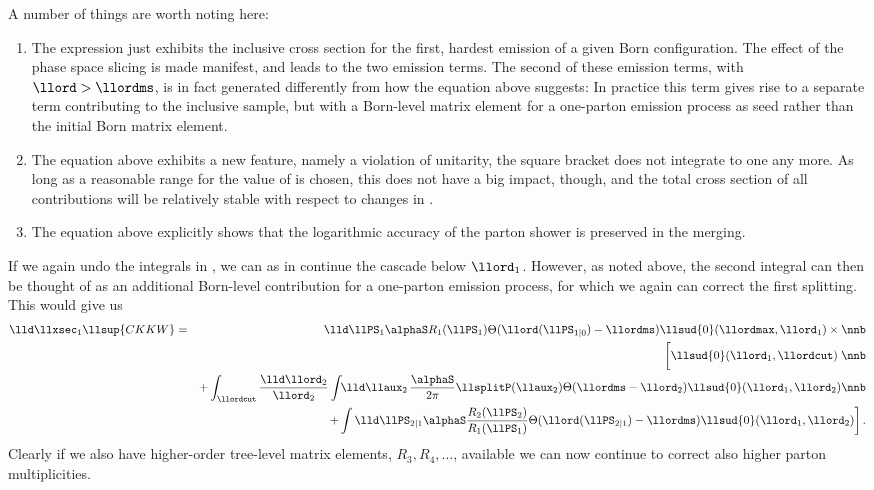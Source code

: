 A number of things are worth noting here:
\begin{enumerate}
\item The expression just exhibits the inclusive cross section for the
  first, hardest emission of a given Born configuration.  The effect
  of the phase space slicing is made manifest, and leads to the two
  emission terms.  The second of these emission terms, with
  $\llord>\llordms$, is in fact generated differently from how the
  equation above suggests: In practice this term gives rise to a
  separate term contributing to the inclusive sample, but with a
  Born-level matrix element for a one-parton emission process as seed
  rather than the initial Born matrix element.
\item The equation above exhibits a new feature, namely a violation of
  unitarity, \ie the square bracket does not integrate to one any more.
  As long as a reasonable range for the value of \llordms is chosen, this 
  does not have a big impact, though, and the total cross section of all
  contributions will be relatively stable with respect to changes in \llordms.  
\item The equation above explicitly shows that the logarithmic accuracy of
  the parton shower is preserved in the merging.
\end{enumerate}


If we again undo the integrals in , we
can as in  continue the cascade below
$\llord_1$. However, as noted above, the second integral can then be
thought of as an additional Born-level contribution for a one-parton
emission process, for which we again can correct the first splitting. This
would give us
\begin{eqnarray}
  \label{eq:matching:CKKWsecond}
  \lld\llxsec_1\llsup{CKKW}&=&
  \lld\llPS_1\alphaS R_1(\llPS_1)\Theta(\llord(\llPS_{1|0})-\llordms)
  \llsud{0}(\llordmax,\llord_1)\times\nnb\\
  &&\left[\llsud{0}(\llord_1,\llordcut)
    \vphantom{\int\frac{R_1}{B}}\right.\nnb\\
    &&+\int_{\llordcut}\frac{\lld\llord_2}{\llord_2}
    \int\!\!\lld\llaux_2\,\frac{\alphaS}{2\pi}\llsplitP(\llaux_2)
    \Theta(\llordms-\llord_2)
    \llsud{0}(\llord_1,\llord_2)\nnb\\
    &&\left.+\int\lld\llPS_{2|1}\alphaS
    \frac{R_2(\llPS_2)}{R_1(\llPS_1)}\Theta(\llord(\llPS_{2|1})-\llordms)
    \llsud{0}(\llord_1,\llord_2)\right].
\end{eqnarray}
Clearly if we also have higher-order tree-level matrix elements,
$R_3,R_4,\ldots$, available we can now continue to correct also higher
parton multiplicities.

